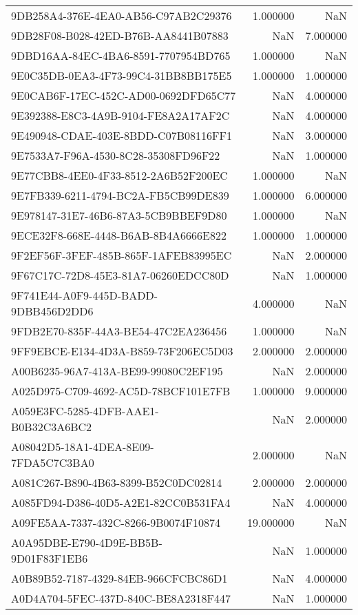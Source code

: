 \begin{tabular}{lrr}
9DB258A4-376E-4EA0-AB56-C97AB2C29376 & 1.000000 & NaN \\
9DB28F08-B028-42ED-B76B-AA8441B07883 & NaN & 7.000000 \\
9DBD16AA-84EC-4BA6-8591-7707954BD765 & 1.000000 & NaN \\
9E0C35DB-0EA3-4F73-99C4-31BB8BB175E5 & 1.000000 & 1.000000 \\
9E0CAB6F-17EC-452C-AD00-0692DFD65C77 & NaN & 4.000000 \\
9E392388-E8C3-4A9B-9104-FE8A2A17AF2C & NaN & 4.000000 \\
9E490948-CDAE-403E-8BDD-C07B08116FF1 & NaN & 3.000000 \\
9E7533A7-F96A-4530-8C28-35308FD96F22 & NaN & 1.000000 \\
9E77CBB8-4EE0-4F33-8512-2A6B52F200EC & 1.000000 & NaN \\
9E7FB339-6211-4794-BC2A-FB5CB99DE839 & 1.000000 & 6.000000 \\
9E978147-31E7-46B6-87A3-5CB9BBEF9D80 & 1.000000 & NaN \\
9ECE32F8-668E-4448-B6AB-8B4A6666E822 & 1.000000 & 1.000000 \\
9F2EF56F-3FEF-485B-865F-1AFEB83995EC & NaN & 2.000000 \\
9F67C17C-72D8-45E3-81A7-06260EDCC80D & NaN & 1.000000 \\
9F741E44-A0F9-445D-BADD-9DBB456D2DD6 & 4.000000 & NaN \\
9FDB2E70-835F-44A3-BE54-47C2EA236456 & 1.000000 & NaN \\
9FF9EBCE-E134-4D3A-B859-73F206EC5D03 & 2.000000 & 2.000000 \\
A00B6235-96A7-413A-BE99-99080C2EF195 & NaN & 2.000000 \\
A025D975-C709-4692-AC5D-78BCF101E7FB & 1.000000 & 9.000000 \\
A059E3FC-5285-4DFB-AAE1-B0B32C3A6BC2 & NaN & 2.000000 \\
A08042D5-18A1-4DEA-8E09-7FDA5C7C3BA0 & 2.000000 & NaN \\
A081C267-B890-4B63-8399-B52C0DC02814 & 2.000000 & 2.000000 \\
A085FD94-D386-40D5-A2E1-82CC0B531FA4 & NaN & 4.000000 \\
A09FE5AA-7337-432C-8266-9B0074F10874 & 19.000000 & NaN \\
A0A95DBE-E790-4D9E-BB5B-9D01F83F1EB6 & NaN & 1.000000 \\
A0B89B52-7187-4329-84EB-966CFCBC86D1 & NaN & 4.000000 \\
A0D4A704-5FEC-437D-840C-BE8A2318F447 & NaN & 1.000000 \\

\end{tabular}
